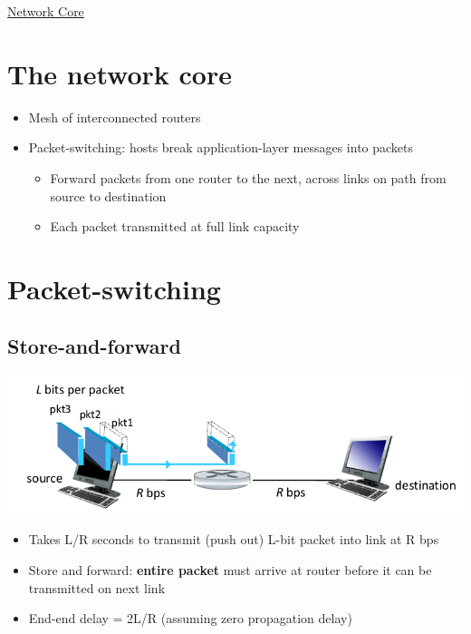 \documentclass{article}[18pt]
\begin{document}
\begin{center}
\underline{\huge Network Core}
\end{center}
\section{The network core}
\begin{itemize}
	\item Mesh of interconnected routers
	\item Packet-switching: hosts break application-layer messages into packets
	\begin{itemize}
		\item Forward packets from one router to the next, across links on path from source to destination
		\item Each packet transmitted at full link capacity
	\end{itemize}
\end{itemize}

\section{Packet-switching}
\subsection{Store-and-forward}
\includegraphics[scale=0.7]{packet-switching}
\begin{itemize}
	\item Takes L/R seconds to transmit (push out) L-bit packet into link at R bps
	\item Store and forward: \textbf{entire packet} must arrive at router before it can be transmitted on next link
	\item End-end delay = 2L/R (assuming zero propagation delay)
\end{itemize}
\end{document}

